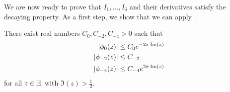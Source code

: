 We are now ready to prove that $I_1, \ldots, I_6$ and their derivatives satisfy the decaying property. As a first step, we show that we can apply .

\begin{boxlemma}\label{Ch4:Lemma:PolyFourierCoeffBound_Apply_a}
    There exist real numbers $C_0, C_{-2}, C_{-4} > 0$ such that
    \begin{align}
        \left\lvert \phi_0\!\left( z \right) \right\rvert &\leq C_{0} e^{-2\pi\operatorname{Im}(z)}  
            \label{Ch4:Eq:PolyFourierCoeffBound_phi_0} \\
        \left\lvert \phi_{-2}\!\left( z \right) \right\rvert &\leq C_{-2}  
            \label{Ch4:Eq:PolyFourierCoeffBound_phi_neg_2} \\
        \left\lvert \phi_{-4}\!\left( z \right) \right\rvert &\leq C_{-4} e^{2\pi\operatorname{Im}(z)}
            \label{Ch4:Eq:PolyFourierCoeffBound_phi_neg_4}
    \end{align}
    for all $z \in \mathbb{H}$ with $\Im(z) > \frac{1}{2}$.
\end{boxlemma}

